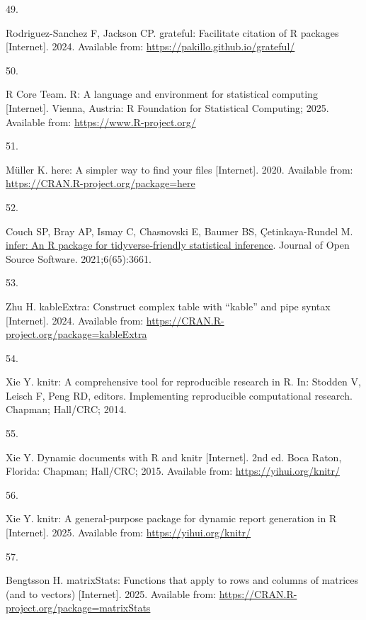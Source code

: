 \documentclass[
]{article}
\newlength{\cslhangindent}
\newlength{\csllabelwidth}
\newenvironment{CSLReferences}[2] %
 {\begin{list}{}{%
  \setlength{\itemindent}{0pt}
  \setlength{\leftmargin}{0pt}
  \setlength{\parsep}{0pt}
  \ifodd #1
   \setlength{\leftmargin}{\cslhangindent}
   \setlength{\itemindent}{-1\cslhangindent}
  \fi
  \setlength{\itemsep}{#2\baselineskip}}}
 {\end{list}}
\newcommand{\CSLLeftMargin}[1]{\parbox[t]{\csllabelwidth}{\strut#1\strut}}
\newcommand{\CSLRightInline}[1]{\parbox[t]{\linewidth - \csllabelwidth}{\strut#1\strut}}
\begin{document}
\begin{CSLReferences}{0}{1}
\CSLLeftMargin{49. }%
\CSLRightInline{Rodriguez-Sanchez F, Jackson CP. {grateful}: Facilitate citation of {R} packages {[}Internet{]}. 2024. Available from: \url{https://pakillo.github.io/grateful/}}

\CSLLeftMargin{50. }%
\CSLRightInline{R Core Team. {R}: A language and environment for statistical computing {[}Internet{]}. Vienna, Austria: R Foundation for Statistical Computing; 2025. Available from: \url{https://www.R-project.org/}}

\CSLLeftMargin{51. }%
\CSLRightInline{Müller K. {here}: A simpler way to find your files {[}Internet{]}. 2020. Available from: \url{https://CRAN.R-project.org/package=here}}

\CSLLeftMargin{52. }%
\CSLRightInline{Couch SP, Bray AP, Ismay C, Chasnovski E, Baumer BS, Çetinkaya-Rundel M. \href{https://doi.org/10.21105/joss.03661}{{infer}: An {R} package for tidyverse-friendly statistical inference}. Journal of Open Source Software. 2021;6(65):3661. }

\CSLLeftMargin{53. }%
\CSLRightInline{Zhu H. {kableExtra}: Construct complex table with {``{kable}''} and pipe syntax {[}Internet{]}. 2024. Available from: \url{https://CRAN.R-project.org/package=kableExtra}}

\CSLLeftMargin{54. }%
\CSLRightInline{Xie Y. {knitr}: A comprehensive tool for reproducible research in {R}. In: Stodden V, Leisch F, Peng RD, editors. Implementing reproducible computational research. Chapman; Hall/CRC; 2014. }

\CSLLeftMargin{55. }%
\CSLRightInline{Xie Y. Dynamic documents with {R} and knitr {[}Internet{]}. 2nd ed. Boca Raton, Florida: Chapman; Hall/CRC; 2015. Available from: \url{https://yihui.org/knitr/}}

\CSLLeftMargin{56. }%
\CSLRightInline{Xie Y. {knitr}: A general-purpose package for dynamic report generation in {R} {[}Internet{]}. 2025. Available from: \url{https://yihui.org/knitr/}}

\CSLLeftMargin{57. }%
\CSLRightInline{Bengtsson H. {matrixStats}: Functions that apply to rows and columns of matrices (and to vectors) {[}Internet{]}. 2025. Available from: \url{https://CRAN.R-project.org/package=matrixStats}}


\end{CSLReferences}
\end{document}
